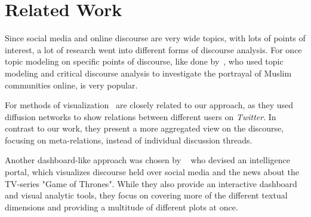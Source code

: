 \chapter{Related Work}
\label{sec:relatedWork}

Since social media and online discourse are very wide topics, with lots of points of interest, a lot of research went into different forms of discourse analysis. For once topic modeling on specific points of discourse, like done by~\cite{TORNBERG2016132}, who used topic modeling and critical discourse analysis to investigate the portrayal of Muslim communities online,  is very popular. 

For methods of visualization~\cite{mckelvey2012visualizing} are closely related to our approach, as they used diffusion networks to show relations between different users on \emph{Twitter}. In contrast to our work, they present a more aggregated view on the discourse, focusing on meta-relations, instead of individual discussion threads. 

Another dashboard-like approach was chosen by ~\cite{SCHARL2016129} who devised an intelligence portal, which visualizes discourse held over social media and the news about the TV-series "Game of Thrones". While they also provide an interactive dashboard and visual analytic tools, they focus on covering more of the different textual dimensions and providing a multitude of different plots at once.